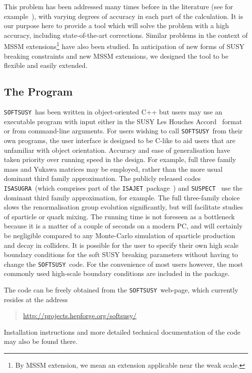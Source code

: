 \documentclass[]{article}
\def\SOFTSUSY{{\tt SOFTSUSY}}
\def\SUSPECT{{\tt SUSPECT}}
\def\ISAJET{{\tt ISASUGRA}}
\begin{document}
 This problem has been addressed many times before in the
literature (see for
example~\cite{Ross:1992tz,Barger:1994gh,Pierce:1997zz,Djouadi:1998di,Baer:1999sp}), 
with  varying degrees of accuracy in each
part of the calculation. It is our purpose here to provide a tool which will
solve the problem with a high accuracy, including state-of-the-art corrections.
Similar problems in the context of MSSM extensions\footnote{By MSSM extension,
we mean an extension applicable near the weak scale.} have also been
studied. In anticipation of new forms of SUSY breaking constraints and new
MSSM extensions, we designed the tool to be flexible and easily extended.

\subsection{The Program}

\SOFTSUSY~has been written in object-oriented C++ but users may use an
executable program with input either in the SUSY Les Houches
Accord~\cite{lhacc} 
format or from command-line arguments. For users wishing to call
\SOFTSUSY~from their own programs, the user interface is designed to be 
C-like to aid users that are unfamiliar with object orientation.
Accuracy and ease of generalisation have taken priority over running speed in the
design. For example,
full three family mass and Yukawa matrices may be employed, rather than
the more usual dominant third family approximation. The
publicly released codes \ISAJET~(which comprises part of the 
{\tt ISAJET}~package~\cite{Baer:1999sp}) and \SUSPECT~\cite{Djouadi:1998di}
use the dominant third family approximation, for example. 
The full three-family choice slows the renormalisation group evolution
significantly, but  
will facilitate studies of sparticle or quark mixing. The running time is not
foreseen as a bottleneck because it is a matter of a couple of seconds on a
modern PC, and will certainly be negligible compared to any Monte-Carlo
simulation of sparticle production and decay in colliders.
It is possible for the user to specify their own high scale boundary
conditions for the soft SUSY 
breaking parameters without having to change the \SOFTSUSY~code.
For the convenience of most users however, the most commonly used
high-scale boundary conditions are included in the package.

The code can be freely obtained from the \SOFTSUSY~web-page, which
currently resides at the address
\begin{quote}
\href{http://projects.hepforge.org/softsusy/}
{http://projects.hepforge.org/softsusy/} 
\end{quote}
Installation instructions and more detailed technical documentation of the
code may also be found there.
\end{document}
